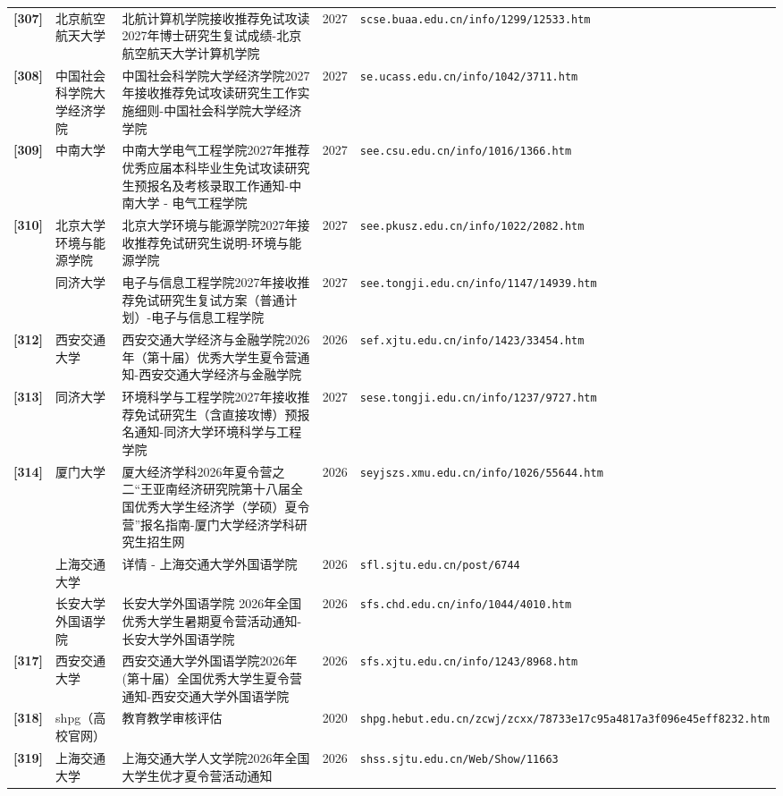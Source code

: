 {\begin{longtable}{@{}p{1.15cm}p{2.9cm}p{6.3cm}p{0.85cm}p{5.0cm}@{}}
\textbf{[307]} & 北京航空航天大学 & 北航计算机学院接收推荐免试攻读2027年博士研究生复试成绩-北京航空航天大学计算机学院 & 2027 & \texttt{scse.buaa.edu.cn/info/1299/12533.htm} \\
\textbf{[308]} & 中国社会科学院大学经济学院 & 中国社会科学院大学经济学院2027年接收推荐免试攻读研究生工作实施细则-中国社会科学院大学经济学院 & 2027 & \texttt{se.ucass.edu.cn/info/1042/3711.htm} \\
\textbf{[309]} & 中南大学 & 中南大学电气工程学院2027年推荐优秀应届本科毕业生免试攻读研究生预报名及考核录取工作通知-中南大学 - 电气工程学院 & 2027 & \texttt{see.csu.edu.cn/info/1016/1366.htm} \\
\textbf{[310]} & 北京大学环境与能源学院 & 北京大学环境与能源学院2027年接收推荐免试研究生说明-环境与能源学院 & 2027 & \texttt{see.pkusz.edu.cn/info/1022/2082.htm} \\
[311] & 同济大学 & 电子与信息工程学院2027年接收推荐免试研究生复试方案（普通计划）-电子与信息工程学院 & 2027 & \texttt{see.tongji.edu.cn/info/1147/14939.htm} \\
\textbf{[312]} & 西安交通大学 & 西安交通大学经济与金融学院2026年（第十届）优秀大学生夏令营通知-西安交通大学经济与金融学院 & 2026 & \texttt{sef.xjtu.edu.cn/info/1423/33454.htm} \\
\textbf{[313]} & 同济大学 & 环境科学与工程学院2027年接收推荐免试研究生（含直接攻博）预报名通知-同济大学环境科学与工程学院 & 2027 & \texttt{sese.tongji.edu.cn/info/1237/9727.htm} \\
\textbf{[314]} & 厦门大学 & 厦大经济学科2026年夏令营之二“王亚南经济研究院第十八届全国优秀大学生经济学（学硕）夏令营”报名指南-厦门大学经济学科研究生招生网 & 2026 & \texttt{seyjszs.xmu.edu.cn/info/1026/55644.htm} \\
[315] & 上海交通大学 & 详情 - 上海交通大学外国语学院 & 2026 & \texttt{sfl.sjtu.edu.cn/post/6744} \\
[316] & 长安大学外国语学院 & 长安大学外国语学院 2026年全国优秀大学生暑期夏令营活动通知-长安大学外国语学院 & 2026 & \texttt{sfs.chd.edu.cn/info/1044/4010.htm} \\
\textbf{[317]} & 西安交通大学 & 西安交通大学外国语学院2026年(第十届）全国优秀大学生夏令营通知-西安交通大学外国语学院 & 2026 & \texttt{sfs.xjtu.edu.cn/info/1243/8968.htm} \\
\textbf{[318]} & shpg（高校官网） & 教育教学审核评估 & 2020 & \texttt{shpg.hebut.edu.cn/zcwj/zcxx/78733e17c95a4817a3f096e45eff8232.htm} \\
\textbf{[319]} & 上海交通大学 & 上海交通大学人文学院2026年全国大学生优才夏令营活动通知 & 2026 & \texttt{shss.sjtu.edu.cn/Web/Show/11663} \\

\end{longtable}}
